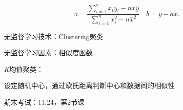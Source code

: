 \[
    a= \frac{\sum_{i=1}^{n} x_{i}y_{i}-n\bar{x}\bar{y}}{\sum_{i=1}^{n} x_{i}^2-n\bar{x}^2}\quad b=\bar{y}-a\bar{x}
.\]
\begin{notation}
    无监督学习技术：Clustering聚类

    无监督学习因素：相似度函数
\end{notation}
\begin{notation}
    \textit{K}均值聚类：

    设定随机中心，通过欧氏距离判断中心和数据间的相似性
\end{notation}
{}
期末考试：11.24，第2节课
